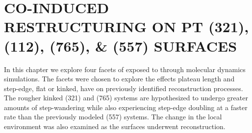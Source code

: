 \chapter{CO-INDUCED RESTRUCTURING ON PT (321), (112), (765), \& (557) SURFACES}



In this chapter we explore four facets of  exposed to  through
molecular dynamics simulations. The facets were chosen to explore the effects
plateau length and step-edge, flat or kinked, have on previously identified
reconstruction processes. The rougher kinked (321) and (765) systems are
hypothesized to undergo greater amounts of step-wandering while also
experiencing step-edge doubling at a faster rate than the previously modeled
(557) systems. The change in the local environment was also examined as the
surfaces underwent reconstruction. 

